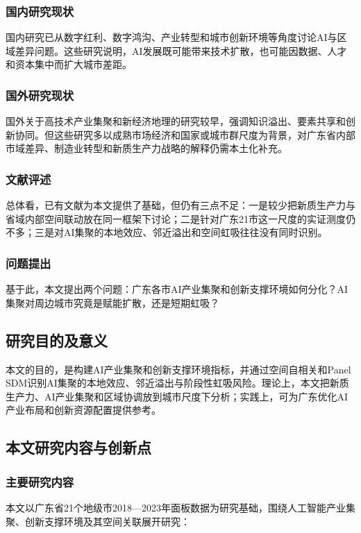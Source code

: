 \documentclass[12pt, a4paper]{ctexart}
\begin{document}
\subsubsection{国内研究现状}
国内研究已从数字红利、数字鸿沟、产业转型和城市创新环境等角度讨论AI与区域差异问题\cite{ref1,nqpf_industry2024,data_factor_scale2024,ref2,leapfrog_coordination2024,ref3,ref4,ref5,ref6}。这些研究说明，AI发展既可能带来技术扩散，也可能因数据、人才和资本集中而扩大城市差距。

\subsubsection{国外研究现状}
国外关于高技术产业集聚和新经济地理的研究较早，强调知识溢出、要素共享和创新协同。但这些研究多以成熟市场经济和国家或城市群尺度为背景，对广东省内部市域差异、制造业转型和新质生产力战略的解释仍需本土化补充。

\subsubsection{文献评述}
总体看，已有文献为本文提供了基础，但仍有三点不足：一是较少把新质生产力与省域内部空间联动放在同一框架下讨论；二是针对广东21市这一尺度的实证测度仍不多；三是对AI集聚的本地效应、邻近溢出和空间虹吸往往没有同时识别。

\subsubsection{问题提出}
基于此，本文提出两个问题：广东各市AI产业集聚和创新支撑环境如何分化？AI集聚对周边城市究竟是赋能扩散，还是短期虹吸？

\subsection{研究目的及意义}
本文的目的，是构建AI产业集聚和创新支撑环境指标，并通过空间自相关和Panel SDM识别AI集聚的本地效应、邻近溢出与阶段性虹吸风险。理论上，本文把新质生产力、AI产业集聚和区域协调放到城市尺度下分析；实践上，可为广东优化AI产业布局和创新资源配置提供参考。

\subsection{本文研究内容与创新点}

\subsubsection{主要研究内容}
本文以广东省21个地级市2018—2023年面板数据为研究基础，围绕人工智能产业集聚、创新支撑环境及其空间关联展开研究：
\end{document}
